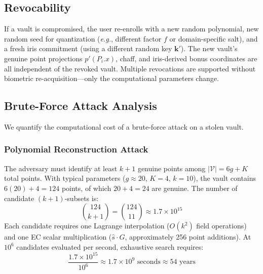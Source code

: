 \documentclass[3p,twocolumn]{elsarticle}
\newcommand{\eg}{\textit{e.g.}}
\begin{document}
\subsection{Revocability}
\label{sec:revocability}

If a vault is compromised, the user re-enrolls with a new random polynomial, new random seed for quantization (\eg{}, different factor $f$ or domain-specific salt), and a fresh iris commitment (using a different random key $\mathbf{k}'$). The new vault's genuine point projections $p'(P_i.x)$, chaff, and iris-derived bonus coordinates are all independent of the revoked vault. Multiple revocations are supported without biometric re-acquisition---only the computational parameters change.

\subsection{Brute-Force Attack Analysis}
\label{sec:brute_force}

We quantify the computational cost of a brute-force attack on a stolen vault.

\subsubsection{Polynomial Reconstruction Attack}
The adversary must identify at least $k+1$ genuine points among $|\mathcal{V}| = 6g + K$ total points. With typical parameters ($g \approx 20$, $K = 4$, $k = 10$), the vault contains $6(20) + 4 = 124$ points, of which $20 + 4 = 24$ are genuine. The number of candidate $(k+1)$-subsets is:
\begin{equation}
    \binom{124}{k+1} = \binom{124}{11} \approx 1.7 \times 10^{15}
    \label{eq:brute_force}
\end{equation}
Each candidate requires one Lagrange interpolation (${O}(k^2)$ field operations) and one EC scalar multiplication ($\hat{s} \cdot G$, approximately 256 point additions). At $10^6$ candidates evaluated per second, exhaustive search requires:
\begin{equation}
    \frac{1.7 \times 10^{15}}{10^6} \approx 1.7 \times 10^{9} \text{ seconds} \approx 54 \text{ years}
\end{equation}
\end{document}
